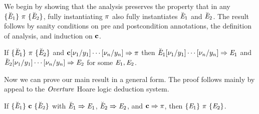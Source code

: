 We begin by showing that the analysis preserves the property that in
any $\{ \breve{\mathit{E}}_1 \}\ \pi\ \{ \breve{\mathit{E}}_2 \}$, fully instantiating $\pi$
also fully instantiates $\breve{\mathit{E}}_1$ and $\breve{\mathit{E}}_2$. The result
follows by sanity conditions on pre and postcondition annotations,
the definition of analysis, and induction on $\mathbf{c}$.
\begin{lemma}
  \label{lemma-closure}
  If $\{ \breve{\mathit{E}}_1 \}\ \pi\ \{ \breve{\mathit{E}}_2 \}$ and $\mathbf{c}[\nu_1/y_1]\cdots[\nu_n/y_n] \Rightarrow \pi$
  then $\breve{\mathit{E}}_1[\nu_1/y_1]\cdots[\nu_n/y_n] \Rightarrow \mathit{E}_1$ and
  $\breve{\mathit{E}}_2[\nu_1/y_1]\cdots[\nu_n/y_n] \Rightarrow \mathit{E}_2$ for some $\mathit{E}_1, \mathit{E}_2$. 
\end{lemma}

Now we can prove our main result in a general form. The proof
follows mainly by appeal to the $\mathit{Overture}$ Hoare logic deduction
system.
\begin{lemma}
  \label{lemma-metahtrip}
  If $\{ \breve{\mathit{E}}_1 \}\ \mathbf{c}\ \{ \breve{\mathit{E}}_2 \}$ with $\breve{\mathit{E}}_1 \Rightarrow
  \mathit{E}_1$, $\breve{\mathit{E}}_2 \Rightarrow \mathit{E}_2$, and $\mathbf{c} \Rightarrow
  \pi$, then $\{ \mathit{E}_1 \}\ \pi\ \{ \mathit{E}_2 \}$.
\end{lemma}

